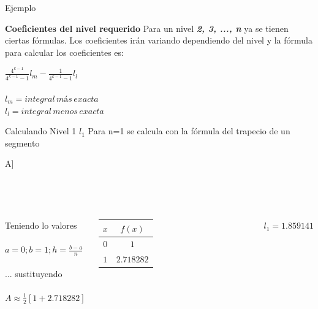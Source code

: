 \documentclass{beamer}
\begin{document}
\begin{frame}{Ejemplo}
\begin{alertblock} 
    {\centering\bf Coeficientes del nivel requerido}
Para un nivel \textit{\textbf{2, 3, ..., n}} ya se tienen ciertas fórmulas. Los coeficientes irán variando dependiendo del nivel y la fórmula para calcular los coeficientes es: \\
\begin{center}
\huge{$\frac{4^{k-1}}{4^{k-1}-1}l_{m}-\frac{1}{4^{k-1}-1}l_{l}$}
\\$\,$\\
{\small $l_{m}=integral\, más\, exacta$}\\
{\small $l_{l}=integral\, menos\, exacta$}
\par\end{center}
\end{alertblock}
\end{frame}

\begin{frame}{Calculando Nivel 1 $l_{1}$}
Para \alert{n=1} se calcula con la fórmula del trapecio de un segmento 
\begin{center}
\alert{{\small A\approx{}\left[f(b)+f(a)\right]]}}
\par\end{center}
\\$\,$\\
\begin{columns}
Teniendo lo valores
\\$\,$\\
\alert{$a=0; b=1; h=\frac{b-a}{n}$}
\\$\,$\\ 
... sustituyendo
\\$\,$\\
\alert{$A\approx\frac{1}{2}\left[1+2.718282\right]$}

\begin{tabular}{|c|c|}
\hline 
$x$ & $f(x)$\tabularnewline
\hline 
\hline 
$0$ & $1$\tabularnewline
\hline 
$1$ & $2.718282$\tabularnewline
\hline 
\end{tabular}
\\$\,$\\
\begin{LARGE}
\begin{center}
\color{green} $l_{1}=1.859141$
\par\end{center}
\end{LARGE}
\end{columns} 
\end{frame}
\end{document}
